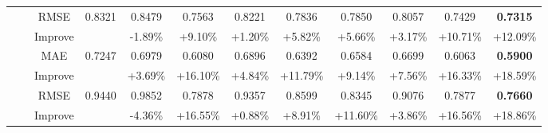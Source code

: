 \begin{table}[t]
{\begin{tabular}{|c|c|c||c|c|c|c|c|c||c|c||c|}
\cline{3-12}
\multirow{16}{*}{} &\multirow{4}{*}{}& {RMSE} & {0.8321} & {0.8479} & {0.7563} & {0.8221} & {0.7836} &  {0.7850} & {0.8057} & {0.7429} &{\textbf{0.7315}} \\
\multirow{16}{*}{} &\multirow{4}{*}{}& {Improve} & {} & {-1.89\%} & {+9.10\%} & {+1.20\%} & {+5.82\%}  & {+5.66\%} & {+3.17\%} &{+10.71\%} & {+12.09\%} \\
\cline{2-12}
\multirow{16}{*}{} &\multirow{4}{*}{}\multirow{4}{*}{20\%} & {MAE}& {0.7247}& {0.6979} & {0.6080} & {0.6896} & {0.6392} &  {0.6584} & {0.6699} & {0.6063} &{\textbf{0.5900}} \\
\multirow{16}{*}{} &\multirow{4}{*}{}& {Improve} & {} & {+3.69\%} & {+16.10\%} & {+4.84\%} & {+11.79\%}  & {+9.14\%} & {+7.56\%} &{+16.33\%} & {+18.59\%} \\
\cline{3-12}
\multirow{16}{*}{} &\multirow{4}{*}{}& {RMSE} & {0.9440} & {0.9852} & {0.7878} & {0.9357} & {0.8599} &  {0.8345} & {0.9076} & {0.7877}  &{\textbf{0.7660}}\\
\multirow{16}{*}{} &\multirow{4}{*}{}& {Improve} & {} & {-4.36\%} & {+16.55\%} & {+0.88\%} & {+8.91\%}  & {+11.60\%} & {+3.86\%} &{+16.56\%}& {+18.86\%} \\



\end{tabular}}
\end{table}
